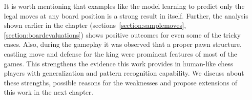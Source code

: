 It is worth mentioning that examples like the model learning to predict only 
the legal moves at any board position is a strong result in itself. Further, 
the analysis shown earlier in the chapter (sections~\ref{section:samplemoves}, 
\ref{section:boardevaluations}) shows positive outcomes for even some of the 
tricky cases. Also, during the gameplay it was observed that a proper pawn 
structure, castling move and defense for the king were prominent features of 
most of the games. This strengthens the evidence this work provides in 
human-like chess players with generalization and pattern recognition capability. 
 We discuss about these strengths, possible reasons for the weaknesses and 
propose extensions of this work in the next chapter.

% 
